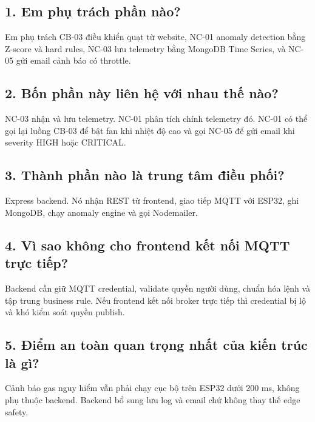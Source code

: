 \documentclass[11pt,oneside,openany]{book}
\begin{document}
\subsection{1. Em phụ trách phần
nào?}\label{1-em-phux1ee5-truxe1ch-phux1ea7n-nuxe0o}

Em phụ trách CB-03 điều khiển quạt từ website, NC-01 anomaly detection
bằng Z-score và hard rules, NC-03 lưu telemetry bằng MongoDB Time
Series, và NC-05 gửi email cảnh báo có throttle.

\subsection{2. Bốn phần này liên hệ với nhau thế
nào?}\label{2-bux1ed1n-phux1ea7n-nuxe0y-liuxean-hux1ec7-vux1edbi-nhau-thux1ebf-nuxe0o}

NC-03 nhận và lưu telemetry. NC-01 phân tích chính telemetry đó. NC-01
có thể gọi lại luồng CB-03 để bật fan khi nhiệt độ cao và gọi NC-05 để
gửi email khi severity HIGH hoặc CRITICAL.

\subsection{3. Thành phần nào là trung tâm điều
phối?}\label{3-thuxe0nh-phux1ea7n-nuxe0o-luxe0-trung-tuxe2m-ux111iux1ec1u-phux1ed1i}

Express backend. Nó nhận REST từ frontend, giao tiếp MQTT với ESP32, ghi
MongoDB, chạy anomaly engine và gọi Nodemailer.

\subsection{4. Vì sao không cho frontend kết nối MQTT trực
tiếp?}\label{4-vuxec-sao-khuxf4ng-cho-frontend-kux1ebft-nux1ed1i-mqtt-trux1ef1c-tiux1ebfp}

Backend cần giữ MQTT credential, validate quyền người dùng, chuẩn hóa
lệnh và tập trung business rule. Nếu frontend kết nối broker trực tiếp
thì credential bị lộ và khó kiểm soát quyền publish.

\subsection{5. Điểm an toàn quan trọng nhất của kiến trúc là
gì?}\label{5-ux111iux1ec3m-an-touxe0n-quan-trux1ecdng-nhux1ea5t-cux1ee7a-kiux1ebfn-truxfac-luxe0-guxec}

Cảnh báo gas nguy hiểm vẫn phải chạy cục bộ trên ESP32 dưới 200 ms,
không phụ thuộc backend. Backend bổ sung lưu log và email chứ không thay
thế edge safety.
\end{document}
